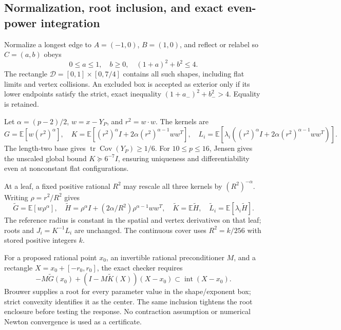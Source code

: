 \documentclass[11pt]{article}
\theoremstyle{definition}
\newcommand{\E}{\mathbb E}
\newcommand{\tr}{\operatorname{tr}}
\begin{document}
\subsection{Normalization, root inclusion, and exact even-power integration}
Normalize a longest edge to $A=(-1,0)$, $B=(1,0)$, and reflect or relabel
so $C=(a,b)$ obeys
\begin{equation}\label{eq:shapes}
 0\le a\le1,\quad b\ge0,\quad (1+a)^2+b^2\le4.
\end{equation}
The rectangle $\mathcal D=[0,1]\times[0,7/4]$ contains all such shapes,
including flat limits and vertex collisions. An excluded box is accepted
as exterior only if its lower endpoints satisfy the strict, exact
inequality $(1+a_-)^2+b_-^2>4$. Equality is retained.

Let $\alpha=(p-2)/2$, $w=x-Y_P$, and $r^2=w\cdot w$. The kernels are
\[
 G=\E[w(r^2)^\alpha],\quad
 K=\E[(r^2)^\alpha I+2\alpha(r^2)^{\alpha-1}ww^T],\quad
 L_i=\E[\lambda_i((r^2)^\alpha I+2\alpha(r^2)^{\alpha-1}ww^T)].
\]
The length-two base gives $\tr\operatorname{Cov}(Y_P)\ge1/6$.
For $10\le p\le16$, Jensen gives the unscaled global bound
$K\succeq6^{-7}I$, ensuring uniqueness and differentiability even at
nonconstant flat configurations.

At a leaf, a fixed positive rational $R^2$ may rescale all three kernels
by $(R^2)^{-\alpha}$. Writing $\rho=r^2/R^2$ gives
\[
 \widetilde G=\E[w\rho^\alpha],\quad
 \widetilde H=\rho^\alpha I+(2\alpha/R^2)\rho^{\alpha-1}ww^T,
 \quad\widetilde K=\E\widetilde H,\quad
 \widetilde L_i=\E[\lambda_i\widetilde H].
\]
The reference radius is constant in the spatial and vertex derivatives on
that leaf; roots and $J_i=K^{-1}L_i$ are unchanged. The continuous cover
uses $R^2=k/256$ with stored positive integers $k$.

For a proposed rational point $x_0$, an invertible rational preconditioner
$M$, and a rectangle $X=x_0+[-r_0,r_0]$, the exact checker requires
\begin{equation}\label{eq:rootbox}
 -M\widetilde G(x_0)+(I-M\widetilde K(X))(X-x_0)
                 \subset\operatorname{int}(X-x_0).
\end{equation}
Brouwer supplies a root for every parameter value in the shape/exponent
box; strict convexity identifies it as the center. The same inclusion
tightens the root enclosure before testing the response. No contraction
assumption or numerical Newton convergence is used as a certificate.
\end{document}
